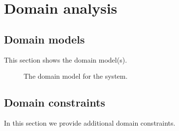 \documentclass[english,peerreview]{sareport}
\begin{document}
\maketitle

\tableofcontents

\chapter{Domain analysis}\label{sec:domain}
\section{Domain models}
This section shows the domain model(s).

\begin{figure}[!htp]
    \centering
    \caption{The domain model for the system.}\label{fig:domain_model}
\end{figure}

\section{Domain constraints}
In this section we provide additional domain constraints.
\end{document}
